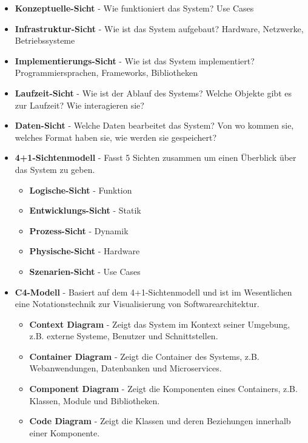 \documentclass[12pt]{scrartcl}
\begin{document}
\begin{itemize}
	\item \textbf{Konzeptuelle-Sicht} - Wie funktioniert das System? Use Cases
	\item \textbf{Infrastruktur-Sicht} - Wie ist das System aufgebaut? Hardware, Netzwerke, Betriebssysteme
	\item \textbf{Implementierungs-Sicht} - Wie ist das System implementiert? Programmiersprachen, Frameworks, Bibliotheken
	\item \textbf{Laufzeit-Sicht} - Wie ist der Ablauf des Systems? Welche Objekte gibt es zur Laufzeit? Wie interagieren sie?
	\item \textbf{Daten-Sicht} - Welche Daten bearbeitet das System? Von wo kommen sie, welches Format haben sie, wie werden sie gespeichert?
	\item \textbf{4+1-Sichtenmodell} - Fasst 5 Sichten zusammen um einen Überblick über das System zu geben.
	      \begin{itemize}
		      \item \textbf{Logische-Sicht} - Funktion
		      \item \textbf{Entwicklungs-Sicht} - Statik
		      \item \textbf{Prozess-Sicht} - Dynamik
		      \item \textbf{Physische-Sicht} - Hardware
		      \item \textbf{Szenarien-Sicht} - Use Cases
	      \end{itemize}
	\item \textbf{C4-Modell} - Basiert auf dem 4+1-Sichtenmodell und ist im Wesentlichen eine Notationstechnik zur Visualisierung von Softwarearchitektur.
	      \begin{itemize}
		      \item \textbf{Context Diagram} - Zeigt das System im Kontext seiner Umgebung, z.B. externe Systeme, Benutzer und Schnittstellen.
		      \item \textbf{Container Diagram} - Zeigt die Container des Systems, z.B. Webanwendungen, Datenbanken und Microservices.
		      \item \textbf{Component Diagram} - Zeigt die Komponenten eines Containers, z.B. Klassen, Module und Bibliotheken.
		      \item \textbf{Code Diagram} - Zeigt die Klassen und deren Beziehungen innerhalb einer Komponente.
	      \end{itemize}
\end{itemize}
\end{document}
